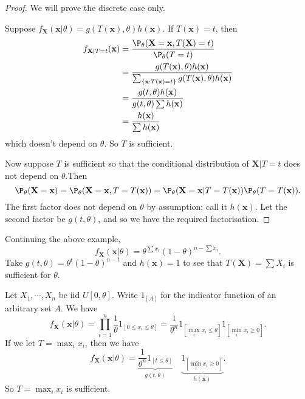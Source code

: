 \documentclass[a4paper]{article}
\begin{document}
\begin{proof}
  We will prove the discrete case only.

  Suppose $f_\mathbf{X}(\mathbf{x}|\theta) = g(T(\mathbf{x}), \theta)h(\mathbf{x})$. If $T(\mathbf{x}) = t$, then
  \begin{align*}
    f_{\mathbf{X}|T = t}(\mathbf{x}) &= \frac{\P_\theta(\mathbf{X} = \mathbf{x}, T(\mathbf{X}) = t)}{\P_\theta (T = t)}\\
    &= \frac{g(T(\mathbf{x}), \theta)h(\mathbf{x})}{\sum_{\{\mathbf{x}:T(\mathbf{x}) = t\}}g(T(\mathbf{x}), \theta)h(\mathbf{x})}\\
    &=\frac{g(t, \theta)h(\mathbf{x})}{g(t, \theta)\sum h(\mathbf{x})}\\
    &= \frac{h(\mathbf{x})}{\sum h(\mathbf{x})}
  \end{align*}
  which doesn't depend on $\theta$. So $T$ is sufficient.

  Now suppose $T$ is sufficient so that the conditional distribution of $\mathbf{X}|T = t$ does not depend on $\theta$.Then
  \[
    \P_\theta(\mathbf{X} = \mathbf{x}) = \P_\theta(\mathbf{X} = \mathbf{x}, T=T(\mathbf{x})) = \P_\theta(\mathbf{X} = \mathbf{x}|T = T(\mathbf{x}))\P_\theta (T = T(\mathbf{x})).
  \]
  The first factor does not depend on $\theta$ by assumption; call it $h(\mathbf{x})$. Let the second factor be $g(t, \theta)$, and so we have the required factorisation.
\end{proof}

\begin{eg}
  Continuing the above example,
  \[
    f_\mathbf{X}(\mathbf{x}|\theta) = \theta^{\sum x_i}(1 - \theta)^{n - \sum x_i}.
  \]
  Take $g(t, \theta) = \theta^t(1 - \theta)^{n - t}$ and $h(\mathbf{x}) = 1$ to see that $T(\mathbf{X}) = \sum X_i$ is sufficient for $\theta$.
\end{eg}

\begin{eg}
  Let $X_1, \cdots, X_n$ be iid $U[0, \theta]$. Write $1_{[A]}$ for the indicator function of an arbitrary set $A$. We have
  \[
    f_\mathbf{X}(\mathbf{x}|\theta) = \prod_{i = 1}^n \frac{1}{\theta}1_{[0 \leq x_i\leq \theta]} = \frac{1}{\theta^n}1_{[\max_i x_i \leq \theta]}1_{[\min_i x_i\geq 0]}.
  \]
  If we let $T = \max_i x_i$, then we have
  \[
    f_\mathbf{X}(\mathbf{x}|\theta) = \underbrace{\frac{1}{\theta^n}1_{[t \leq \theta]}}_{g(t, \theta)}\quad \underbrace{1_{[\min_i x_i \geq 0]}}_{h(\mathbf{x})}.
  \]
  So $T = \max_i x_i$ is sufficient.
\end{eg}
\end{document}
